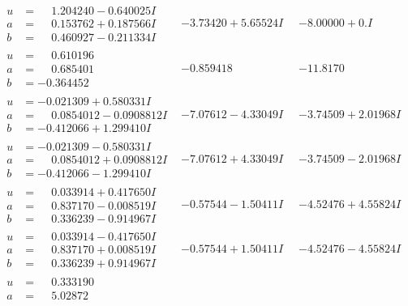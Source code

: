 \documentclass[1p]{elsarticle_modified}
\theoremstyle{definition}
\begin{document}
$$\begin{array}{c|c|c}
\begin{aligned}
u &= \phantom{-}1.204240 - 0.640025 I \\
a &= \phantom{-}0.153762 + 0.187566 I \\
b &= \phantom{-}0.460927 - 0.211334 I\end{aligned}
 & -3.73420 + 5.65524 I & -8.00000 + 0. I\phantom{ +0.000000I} \\ \hline\begin{aligned}
u &= \phantom{-}0.610196\phantom{ +0.000000I} \\
a &= \phantom{-}0.685401\phantom{ +0.000000I} \\
b &= -0.364452\phantom{ +0.000000I}\end{aligned}
 & -0.859418\phantom{ +0.000000I} & -11.8170\phantom{ +0.000000I} \\ \hline\begin{aligned}
u &= -0.021309 + 0.580331 I \\
a &= \phantom{-}0.0854012 - 0.0908812 I \\
b &= -0.412066 + 1.299410 I\end{aligned}
 & -7.07612 - 4.33049 I & -3.74509 + 2.01968 I \\ \hline\begin{aligned}
u &= -0.021309 - 0.580331 I \\
a &= \phantom{-}0.0854012 + 0.0908812 I \\
b &= -0.412066 - 1.299410 I\end{aligned}
 & -7.07612 + 4.33049 I & -3.74509 - 2.01968 I \\ \hline\begin{aligned}
u &= \phantom{-}0.033914 + 0.417650 I \\
a &= \phantom{-}0.837170 - 0.008519 I \\
b &= \phantom{-}0.336239 - 0.914967 I\end{aligned}
 & -0.57544 - 1.50411 I & -4.52476 + 4.55824 I \\ \hline\begin{aligned}
u &= \phantom{-}0.033914 - 0.417650 I \\
a &= \phantom{-}0.837170 + 0.008519 I \\
b &= \phantom{-}0.336239 + 0.914967 I\end{aligned}
 & -0.57544 + 1.50411 I & -4.52476 - 4.55824 I \\ \hline\begin{aligned}
u &= \phantom{-}0.333190\phantom{ +0.000000I} \\
a &= \phantom{-}5.02872\phantom{ +0.000000I} \\

\end{aligned}
\end{array}$$
\end{document}
